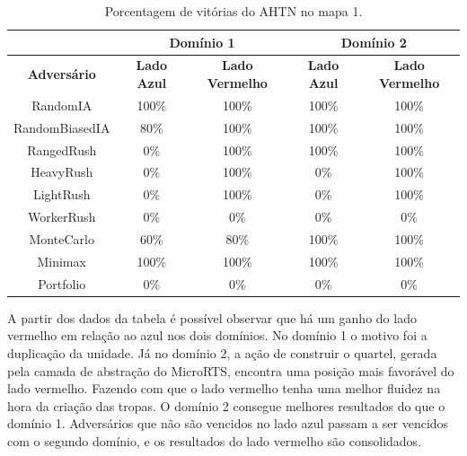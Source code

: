 \begin{table}[ht]
	\centering
	\caption{Porcentagem de vitórias do AHTN no mapa 1.}
	\label{tab:mapa1}
	\begin{tabular}{|c|cc|cc|}
		\hline
		\textbf{}           & \multicolumn{2}{c|}{\textbf{Domínio 1}}  & \multicolumn{2}{c|}{\textbf{Domínio 2}}  \\ \hline
		\textbf{Adversário} & \textbf{Lado Azul} & \textbf{Lado Vermelho} & \textbf{Lado Azul} & \textbf{Lado Vermelho} \\ \hline
		RandomIA            & 100\%              & 100\%                  & 100\%              & 100\%                  \\ \hline
		RandomBiasedIA      & 80\%               & 100\%                  & 100\%              & 100\%                  \\ \hline
		RangedRush          & 0\%                & 100\%                  & 100\%              & 100\%                  \\ \hline
		HeavyRush           & 0\%                & 100\%                  & 0\%                & 100\%                  \\ \hline
		LightRush           & 0\%                & 100\%                  & 0\%                & 100\%                  \\ \hline
		WorkerRush          & 0\%                & 0\%                    & 0\%                & 0\%                    \\ \hline
		MonteCarlo          & 60\%               & 80\%                   & 100\%              & 100\%                  \\ \hline
		Minimax             & 100\%              & 100\%                  & 100\%              & 100\%                  \\ \hline
		Portfolio           & 0\%                & 0\%                    & 0\%                & 0\%                    \\ \hline
	\end{tabular}
\end{table}

A partir dos dados da tabela é possível observar que há um ganho do lado vermelho em relação ao azul nos dois domínios. 
No domínio 1 o motivo foi a duplicação da unidade.
Já no domínio 2, a ação de construir o quartel, gerada pela camada de abstração do MicroRTS, encontra uma posição mais favorável do lado vermelho.
Fazendo com que o lado vermelho tenha uma melhor fluidez na hora da criação das tropas.
O domínio 2 consegue melhores resultados do que o domínio 1.
Adversários que não são vencidos no lado azul passam a ser vencidos com o segundo domínio, e os resultados do lado vermelho são consolidados.

